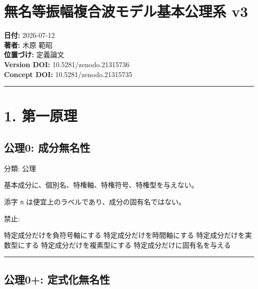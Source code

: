 \documentclass[
  a4paper]{ltjsarticle}
\author{}
\date{}
\newenvironment{Shaded}{}{}
\newcommand{\NormalTok}[1]{#1}
\begin{document}
\section{無名等振幅複合波モデル基本公理系
v3}\label{ux7121ux540dux7b49ux632fux5e45ux8907ux5408ux6ce2ux30e2ux30c7ux30ebux57faux672cux516cux7406ux7cfb-v3}

\textbf{日付:} 2026-07-12\\
\textbf{著者:} 木原 範昭\\
\textbf{位置づけ:} 定義論文\\
\textbf{Version DOI:} 10.5281/zenodo.21315736\\
\textbf{Concept DOI:} 10.5281/zenodo.21315735

\begin{center}\rule{0.5\linewidth}{0.5pt}\end{center}

\section{1. 第一原理}\label{ux7b2cux4e00ux539fux7406}

\subsection{公理0:
成分無名性}\label{ux516cux74060-ux6210ux5206ux7121ux540dux6027}

分類: 公理

基本成分に、個別名、特権軸、特権符号、特権型を与えない。

添字 \texttt{n} は便宜上のラベルであり、成分の固有名ではない。

禁止:

\begin{Shaded}
\begin{Highlighting}[]
\NormalTok{特定成分だけを負符号軸にする}
\NormalTok{特定成分だけを時間軸にする}
\NormalTok{特定成分だけを実数型にする}
\NormalTok{特定成分だけを複素型にする}
\NormalTok{特定成分だけに固有名を与える}
\end{Highlighting}
\end{Shaded}

\begin{center}\rule{0.5\linewidth}{0.5pt}\end{center}

\subsection{公理0+:
定式化無名性}\label{ux516cux74060-ux5b9aux5f0fux5316ux7121ux540dux6027}
\end{document}
